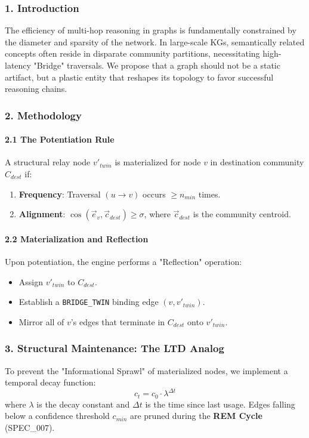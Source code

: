 \documentclass[10pt,journal,compsoc]{IEEEtran}
\begin{document}
\subsubsection{1. Introd\-uction}
The efficiency of multi-hop reasoning in graphs is funda\-mentally constrained by the diameter and sparsity of the network. In large-scale KGs, seman\-tically related concepts often reside in disparate community partitions, neces\-sitating high-latency "Bridge" traversals. We propose that a graph should not be a static artifact, but a plastic entity that reshapes its topology to favor successful reasoning chains.

\subsubsection{2. Methodology}

\paragraph{2.1 The Potent\-iation Rule}
A structural relay node $v'_{twin}$ is mater\-ialized for node $v$ in destination community $C_{dest}$ if:
\begin{enumerate}
\item \textbf{Frequency}: Traversal $(u \to v)$ occurs $\geq n_{min}$ times.
\item \textbf{Alignment}: $\cos(\vec{e}_v, \vec{c}_{dest}) \geq \sigma$, where $\vec{c}_{dest}$ is the community centroid.

\end{enumerate}
\paragraph{2.2 Materi\-alization and Reflection}
Upon poten\-tiation, the engine performs a "Reflection" operation:
\begin{itemize}
\item Assign $v'_{twin}$ to $C_{dest}$.
\item Establish a \texttt{BRIDGE\_TWIN} binding edge $(v, v'_{twin})$.
\item Mirror all of $v$'s edges that terminate in $C_{dest}$ onto $v'_{twin}$.

\end{itemize}
\subsubsection{3. Structural Maintenance: The LTD Analog}
To prevent the "Inform\-ational Sprawl" of mater\-ialized nodes, we implement a temporal decay function:
\begin{equation}
c_t = c_0 \cdot \lambda^{\Delta t}
\end{equation}
where $\lambda$ is the decay constant and $\Delta t$ is the time since last usage. Edges falling below a confidence threshold $c_{min}$ are pruned during the \textbf{REM Cycle} (SPEC\_007).
\end{document}
